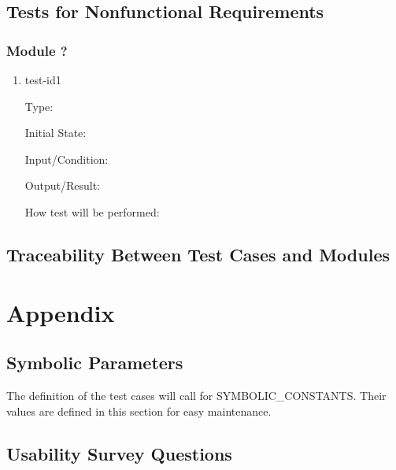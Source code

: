 \documentclass[12pt, titlepage]{article}
\begin{document}
\subsection{Tests for Nonfunctional Requirements}



\subsubsection{Module ?}

\begin{enumerate}

\item{test-id1\\}

Type: 

Initial State: 

Input/Condition: 

Output/Result: 

How test will be performed: 


\end{enumerate}

\subsection{Traceability Between Test Cases and Modules}

\newpage

\section{Appendix}

\subsection{Symbolic Parameters}

The definition of the test cases will call for SYMBOLIC\_CONSTANTS.
Their values are defined in this section for easy maintenance.

\subsection{Usability Survey Questions}
\end{document}
